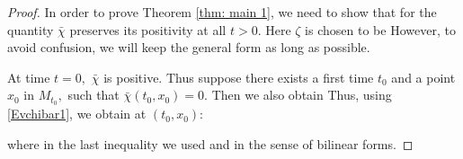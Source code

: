 \documentclass{amsart}
\begin{document}
\begin{proof}
In order to prove Theorem \ref{thm: main 1}, we need to show that for
the quantity $\bar{\chi}$ preserves its positivity at all $t>0.$ Here $\zeta$ is chosen to be
However, to avoid confusion, we will keep the general form as long as possible.

At time $t=0,$ $\bar\chi$ is positive.
Thus suppose there exists a first time $t_0$ and a point $x_0$ in $M_{t_0},$ such that $\bar{\chi}(t_0,x_0)=0.$
Then we also obtain
Thus, using \eqref{Evchibar1}, we obtain at $(t_0,x_0):$

where in the last inequality we used
and
in the sense of bilinear forms.


\end{proof}
\end{document}
